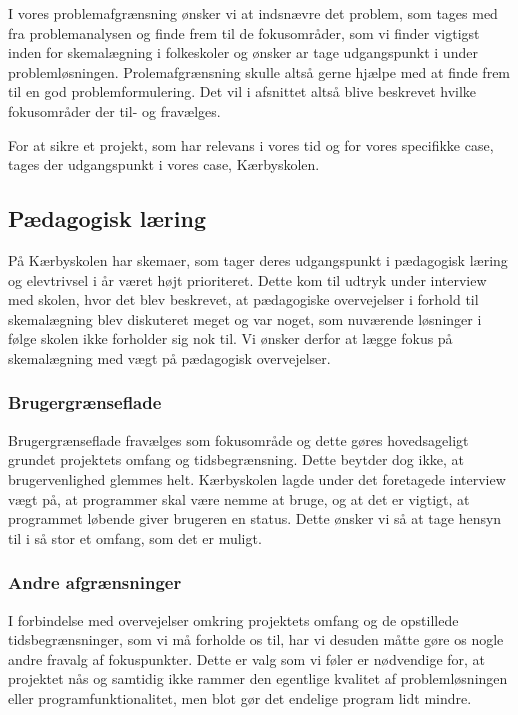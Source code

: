 
I vores problemafgrænsning ønsker vi at indsnævre det problem, som tages med fra problemanalysen og finde frem til de fokusområder, som vi finder vigtigst inden for skemalægning i folkeskoler og ønsker ar tage udgangspunkt i under problemløsningen. Prolemafgrænsning skulle altså gerne hjælpe med at finde frem til en god problemformulering. Det vil i afsnittet altså blive beskrevet hvilke fokusområder der til- og fravælges.

For at sikre et projekt, som har relevans i vores tid og for vores specifikke case, tages der udgangspunkt i vores case, Kærbyskolen.

\subsection*{Pædagogisk læring}
På Kærbyskolen har skemaer, som tager deres udgangspunkt i pædagogisk læring og elevtrivsel i år været højt prioriteret. Dette kom til udtryk under interview med skolen, hvor det blev beskrevet, at pædagogiske overvejelser i forhold til skemalægning blev diskuteret meget og var noget, som nuværende løsninger i følge skolen ikke forholder sig nok til. Vi ønsker derfor at lægge fokus på skemalægning med vægt på pædagogisk overvejelser.

\subsubsection*{Brugergrænseflade}
Brugergrænseflade fravælges som fokusområde og dette gøres hovedsageligt grundet projektets omfang og tidsbegrænsning. Dette beytder dog ikke, at brugervenlighed glemmes helt. Kærbyskolen lagde under det foretagede interview vægt på, at programmer skal være nemme at bruge, og at det er vigtigt, at programmet løbende giver brugeren en status. Dette ønsker vi så at tage hensyn til i så stor et omfang, som det er muligt.

\subsubsection*{Andre afgrænsninger}
I forbindelse med overvejelser omkring projektets omfang og de opstillede tidsbegrænsninger, som vi må forholde os til, har vi desuden måtte gøre os nogle andre fravalg af fokuspunkter. Dette er valg som vi føler er nødvendige for, at projektet nås og samtidig ikke rammer den egentlige kvalitet af problemløsningen eller programfunktionalitet, men blot gør det endelige program lidt mindre.

